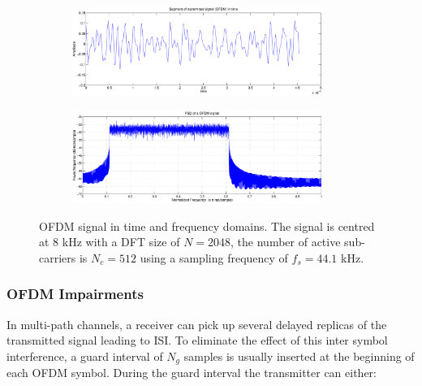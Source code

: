 \documentclass[12pt,a4paper,openright]{report}
\begin{document}
\begin{figure}[H]
 \centering
	\begin{subfigure}[H]{0.9\textwidth}
 	\centering
    \includegraphics[width=0.9\textwidth]{ofdmsignal.eps}

	\end{subfigure}
	
	\begin{subfigure}[H]{0.9\textwidth}
 	\centering
    \includegraphics[width=0.9\textwidth]{psdofdm.eps}
 	\end{subfigure}
    \caption[OFDM signal in time and frequency domains.]{OFDM signal in time and frequency domains. The signal is centred at 8 kHz with a DFT size of $N=2048$, the number of active sub-carriers is $N_c =512$ using a sampling frequency of $f_s=44.1$ kHz.}
    \label{fig:ofdmsig}
\end{figure}


\subsubsection{OFDM Impairments}
\label{sub:OFDMimpairments}
In multi-path channels, a receiver can pick up several delayed replicas of the transmitted signal leading to ISI. To eliminate the effect of this inter symbol interference, a guard interval of $N_g$ samples is usually inserted at the beginning of each OFDM symbol. During the guard interval the transmitter can either:
\end{document}
